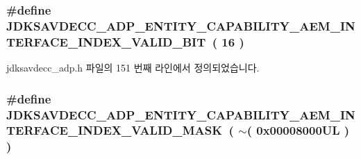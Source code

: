 \subsubsection[{\texorpdfstring{J\+D\+K\+S\+A\+V\+D\+E\+C\+C\+\_\+\+A\+D\+P\+\_\+\+E\+N\+T\+I\+T\+Y\+\_\+\+C\+A\+P\+A\+B\+I\+L\+I\+T\+Y\+\_\+\+A\+E\+M\+\_\+\+I\+N\+T\+E\+R\+F\+A\+C\+E\+\_\+\+I\+N\+D\+E\+X\+\_\+\+V\+A\+L\+I\+D\+\_\+\+B\+IT}{JDKSAVDECC_ADP_ENTITY_CAPABILITY_AEM_INTERFACE_INDEX_VALID_BIT}}]{\setlength{\rightskip}{0pt plus 5cm}\#define J\+D\+K\+S\+A\+V\+D\+E\+C\+C\+\_\+\+A\+D\+P\+\_\+\+E\+N\+T\+I\+T\+Y\+\_\+\+C\+A\+P\+A\+B\+I\+L\+I\+T\+Y\+\_\+\+A\+E\+M\+\_\+\+I\+N\+T\+E\+R\+F\+A\+C\+E\+\_\+\+I\+N\+D\+E\+X\+\_\+\+V\+A\+L\+I\+D\+\_\+\+B\+IT~( 16 )}\hypertarget{group__adp__entity__capability_ga47da285cb2190efe4f7c862b60c2f99b}{}\label{group__adp__entity__capability_ga47da285cb2190efe4f7c862b60c2f99b}


jdksavdecc\+\_\+adp.\+h 파일의 151 번째 라인에서 정의되었습니다.

\subsubsection[{\texorpdfstring{J\+D\+K\+S\+A\+V\+D\+E\+C\+C\+\_\+\+A\+D\+P\+\_\+\+E\+N\+T\+I\+T\+Y\+\_\+\+C\+A\+P\+A\+B\+I\+L\+I\+T\+Y\+\_\+\+A\+E\+M\+\_\+\+I\+N\+T\+E\+R\+F\+A\+C\+E\+\_\+\+I\+N\+D\+E\+X\+\_\+\+V\+A\+L\+I\+D\+\_\+\+M\+A\+SK}{JDKSAVDECC_ADP_ENTITY_CAPABILITY_AEM_INTERFACE_INDEX_VALID_MASK}}]{\setlength{\rightskip}{0pt plus 5cm}\#define J\+D\+K\+S\+A\+V\+D\+E\+C\+C\+\_\+\+A\+D\+P\+\_\+\+E\+N\+T\+I\+T\+Y\+\_\+\+C\+A\+P\+A\+B\+I\+L\+I\+T\+Y\+\_\+\+A\+E\+M\+\_\+\+I\+N\+T\+E\+R\+F\+A\+C\+E\+\_\+\+I\+N\+D\+E\+X\+\_\+\+V\+A\+L\+I\+D\+\_\+\+M\+A\+SK~( $\sim$( 0x00008000\+U\+L ) )}\hypertarget{group__adp__entity__capability_ga759f2e88a113892e0074a69928046372}{}\label{group__adp__entity__capability_ga759f2e88a113892e0074a69928046372}


